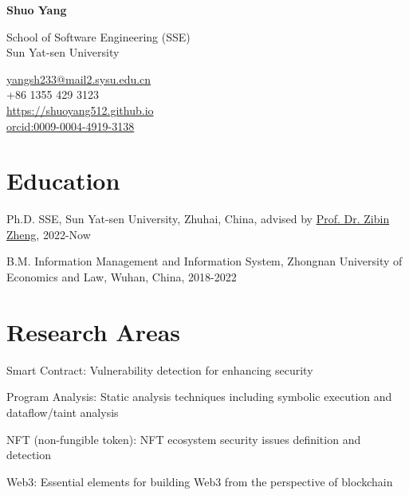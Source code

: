 \documentclass[12pt,letterpaper]{report}
\newcommand{\myname}{Shuo Yang}
\newcommand{\namefont}[1]{{\normalfont\bfseries\Huge{#1}}}
\newcommand{\listitemspace}{0.25em}
\renewenvironment{itemize}
{\begin{list}{}{\setlength{\leftmargin}{0em}
                \setlength{\parskip}{0em}
                \setlength{\itemsep}{\listitemspace}
                \setlength{\parsep}{\listitemspace}}}
{\end{list}}
\begin{document}
    \raggedright{}

    \namefont{\myname}

    \vspace{1em}
    \begin{minipage}[t]{0.700\textwidth}
        School of Software Engineering (SSE)\\
        Sun Yat-sen University
    \end{minipage}
    \begin{minipage}[t]{0.295\textwidth}
        \flushright{}
        \href{yangsh233@mail2.sysu.edu.cn}{yangsh233@mail2.sysu.edu.cn} \\
        +86 1355 429 3123 \\
        \href{https://shuoyang512.github.io}{https://shuoyang512.github.io}\\
        \href{https://orcid.org/0009-0004-4919-3138}{orcid:0009-0004-4919-3138}
    \end{minipage}

    \section*{Education}
    
    \begin{tablist}
      \item[Ph.D.] \tab{}SSE, Sun Yat-sen University, Zhuhai, China, advised by \href{http://www.zibinzheng.com/cv}{Prof. Dr. Zibin Zheng}, 2022-Now
      \item[B.M.] \tab{}Information Management and Information System, Zhongnan University of Economics and Law, Wuhan, China, 2018-2022
    \end{tablist}
    
    \section*{Research Areas}
    \begin{itemize}
      \item Smart Contract: Vulnerability detection for enhancing security
      \item Program Analysis: Static analysis techniques including symbolic execution and dataflow/taint analysis
      \item NFT (non-fungible token): NFT ecosystem security issues definition and detection
      \item Web3: Essential elements for building Web3 from the perspective of blockchain
    \end{itemize}
    
\end{document}
